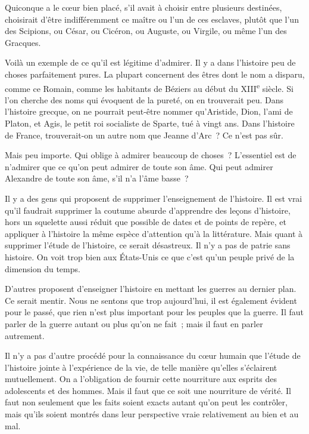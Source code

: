 \documentclass[french,twoside]{book} %
\begin{document}
Quiconque a le cœur bien placé, s'il avait à choisir entre plusieurs destinées, choisirait d'être indifféremment ce maître ou l'un de ces esclaves, plutôt que l'un des Scipions, ou César, ou Cicéron, ou Auguste, ou Virgile, ou même l'un des Gracques.\par
Voilà un exemple de ce qu'il est légitime d'admirer. Il y a dans l'histoire peu de choses parfaitement pures. La plupart concernent des êtres dont le nom a disparu, comme ce Romain, comme les habitants de Béziers au début du XIII\textsuperscript{e} siècle. Si l'on cherche des noms qui évoquent de la pureté, on en trouverait peu. Dans l'histoire grecque, on ne pourrait peut-être nommer qu'Aristide, Dion, l'ami de Platon, et Agis, le petit roi socialiste de Sparte, tué à vingt ans. Dans l'histoire de France, trouverait-on un autre nom que Jeanne d'Arc ? Ce n'est pas sûr.\par
Mais peu importe. Qui oblige à admirer beaucoup de choses ? L'essentiel est de n'admirer que ce qu'on peut admirer de toute son âme. Qui peut admirer Alexandre de toute son âme, s'il n'a l'âme basse ?\par
Il y a des gens qui proposent de supprimer l'enseignement de l'histoire. Il est vrai qu'il faudrait supprimer la coutume absurde d'apprendre des leçons d'histoire, hors un squelette aussi réduit que possible de dates et de points de repère, et appliquer à l'histoire la même espèce d'attention qu'à la littérature. Mais quant à supprimer l'étude de l'histoire, ce serait désastreux. Il n'y a pas de patrie sans histoire. On voit trop bien aux États-Unis ce que c'est qu'un peuple privé de la dimension du temps.\par
D'autres proposent d'enseigner l'histoire en mettant les guerres au dernier plan. Ce serait mentir. Nous ne sentons que trop aujourd'hui, il est également évident pour le passé, que rien n'est plus important pour les peuples que la guerre. Il faut parler de la guerre autant ou plus qu'on ne fait ; mais il faut en parler autrement.\par
Il n'y a pas d'autre procédé pour la connaissance du cœur humain que l'étude de l'histoire jointe à l'expérience de la vie, de telle manière qu'elles s'éclairent mutuellement. On a l'obligation de fournir cette nourriture aux esprits des adolescents et des hommes. Mais il faut que ce soit une nourriture de vérité. Il faut non seulement que les faits soient exacts autant qu'on peut les contrôler, mais qu'ils soient montrés dans leur perspective vraie relativement au bien et au mal.\par
\end{document}

